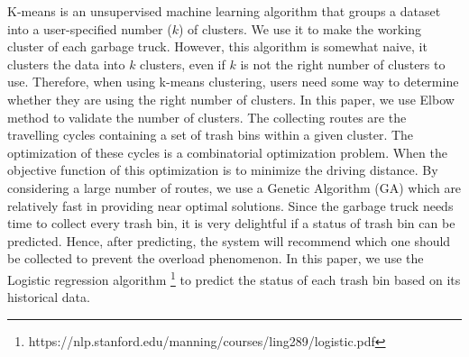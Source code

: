 \documentclass[conference]{IEEEtran}
\begin{document}
\par K-means \cite{Kanungo2003} is an unsupervised machine learning algorithm that groups a dataset into a user-specified number ($k$) of clusters. We use it to make the working cluster of each garbage truck. However, this algorithm is somewhat naive, it clusters the data into $k$ clusters, even if $k$ is not the right number of clusters to use. Therefore, when using k-means clustering, users need some way to determine whether they are using the right number of clusters. In this paper, we use Elbow method \cite{Kodinariya2013} to validate the number of clusters. The collecting routes are the travelling cycles containing a set of trash bins within a given cluster. The optimization of these cycles is a combinatorial optimization problem. When the objective function of this optimization is to minimize the driving distance. By considering a large number of routes, we use a Genetic Algorithm (GA) \cite{Gutierrez2008} which are relatively fast in providing near optimal solutions. Since the garbage truck needs time to collect every trash bin, it is very delightful if a status of trash bin can be predicted. Hence, after predicting, the system will recommend which one should be collected to prevent the overload phenomenon. In this paper, we use the Logistic regression algorithm \footnote{https://nlp.stanford.edu/manning/courses/ling289/logistic.pdf} to predict the status of each trash bin based on its historical data.
\end{document}
